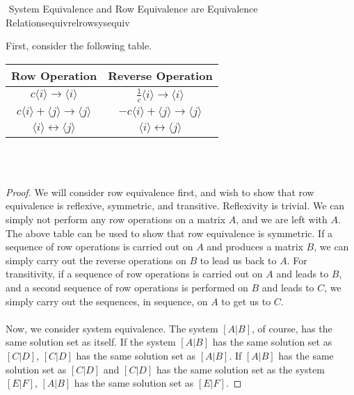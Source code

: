     \begin{theorem}{\Stop\,\,System Equivalence and Row Equivalence are Equivalence Relations}{equivrelrowsysequiv}
    
        First, consider the following table.
        \begin{center}
            \begin{tabular}{c|c}
                \hline
                Row Operation & Reverse Operation \\
                \hline
                \(c\langle i\rangle \to \langle i\rangle\) & \(\frac{1}{c}\langle i\rangle \to \langle i \rangle\) \\
                \(c\langle i \rangle+\langle j \rangle \to\langle j\rangle\) & \(-c\langle i \rangle+\langle j \rangle\to\langle j \rangle\) \\
                \(\langle i \rangle \leftrightarrow \langle j \rangle\) & \(\langle i \rangle \leftrightarrow \langle j \rangle\) \\
                \hline
            \end{tabular}
        \end{center}
        \vphantom
        \\
        \\
        \begin{proof}
            We will consider row equivalence first, and wish to show that row equivalence is reflexive, symmetric, and transitive. Reflexivity is trivial. We can simply not perform any row operations on a matrix \(A\), and we are left with \(A\). The above table can be used to show that row equivalence is symmetric. If a sequence of row operations is carried out on \(A\) and produces a matrix \(B\), we can simply carry out the reverse operations on \(B\) to lead us back to \(A\). For transitivity, if a sequence of row operations is carried out on \(A\) and leads to \(B\), and a second sequence of row operations is performed on \(B\) and leads to \(C\), we simply carry out the sequences, in sequence, on \(A\) to get us to \(C\).
            \\
            \\
            Now, we consider system equivalence. The system \([A|B]\), of course, has the same solution set as itself. If the system \([A|B]\) has the same solution set as \([C|D]\), \([C|D]\) has the same solution set as \([A|B]\). If \([A|B]\) has the same solution set as \([C|D]\) and \([C|D]\) has the same solution set as the system \([E|F]\), \([A|B]\) has the same solution set as \([E|F]\).
        \end{proof}
        
    \end{theorem}

